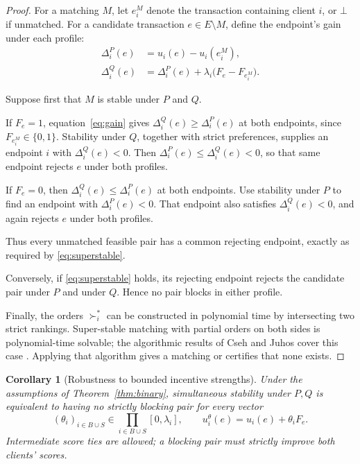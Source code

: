 \documentclass[11pt,letterpaper]{article}
\newtheorem{corollary}[theorem]{Corollary}
\theoremstyle{definition}
\theoremstyle{remark}
\newcommand{\botv}{\bot}
\begin{document}
\begin{proof}
For a matching \(M\), let \(e_i^M\) denote the transaction containing client \(i\),
or \(\botv\) if unmatched. For a candidate transaction \(e\in E\setminus M\),
define the endpoint's gain under each profile:
\begin{align}
\Delta_i^P(e)
 &=u_i(e)-u_i(e_i^M),\\
\Delta_i^Q(e)
 &=\Delta_i^P(e)+\lambda_i\bigl(F_e-F_{e_i^M}\bigr).
\label{eq:gain}
\end{align}

Suppose first that \(M\) is stable under \(P\) and \(Q\).

If \(F_e=1\), equation~\eqref{eq:gain} gives
\(\Delta_i^Q(e)\geq\Delta_i^P(e)\) at both endpoints, since
\(F_{e_i^M}\in\{0,1\}\). Stability under \(Q\), together with strict
preferences, supplies an endpoint \(i\) with \(\Delta_i^Q(e)<0\).
Then \(\Delta_i^P(e)\leq\Delta_i^Q(e)<0\), so that same endpoint rejects
\(e\) under both profiles.

If \(F_e=0\), then \(\Delta_i^Q(e)\leq\Delta_i^P(e)\) at both endpoints.
Use stability under \(P\) to find an endpoint with
\(\Delta_i^P(e)<0\). That endpoint also satisfies \(\Delta_i^Q(e)<0\),
and again rejects \(e\) under both profiles.

Thus every unmatched feasible pair has a common rejecting endpoint, exactly
as required by \eqref{eq:superstable}.

Conversely, if \eqref{eq:superstable} holds, its rejecting endpoint rejects
the candidate pair under \(P\) and under \(Q\). Hence no pair blocks in either
profile.

Finally, the orders \(\succ_i^*\) can be constructed in polynomial time by
intersecting two strict rankings. Super-stable matching with partial orders
on both sides is polynomial-time solvable; the algorithmic results of
Cseh and Juhos cover this case \cite{cseh2021}. Applying that algorithm gives
a matching or certifies that none exists.
\end{proof}

\begin{corollary}[Robustness to bounded incentive strengths]
\label{cor:robust}
Under the assumptions of Theorem~\ref{thm:binary}, simultaneous stability under
\(P,Q\) is equivalent to having no strictly blocking pair for every vector
\[
(\theta_i)_{i\in B\cup S}\in
\prod_{i\in B\cup S}[0,\lambda_i],
\qquad
u_i^\theta(e)=u_i(e)+\theta_iF_e.
\]
Intermediate score ties are allowed; a blocking pair must strictly improve
both clients' scores.
\end{corollary}
\end{document}
